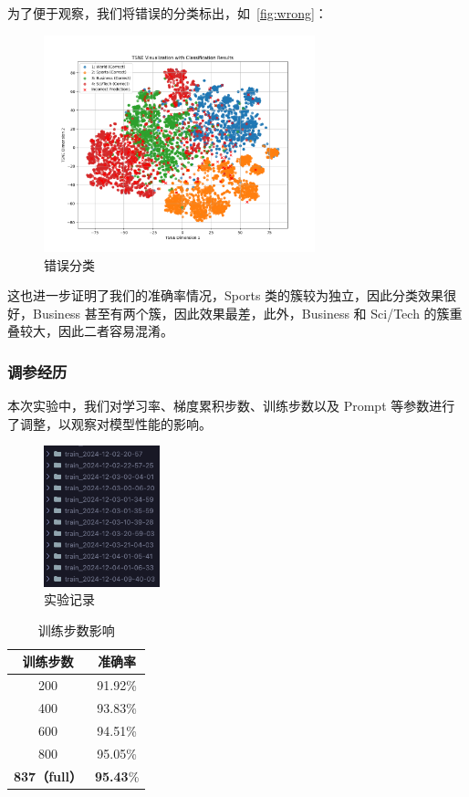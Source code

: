 为了便于观察，我们将错误的分类标出，如~\autoref{fig:wrong}：\begin{figure}[htbp]
    \centering
    \includegraphics[width=0.7\textwidth]{images/classification_tsne_with_incorrect.png}
    \caption{错误分类}
    \label{fig:wrong}
\end{figure}

这也进一步证明了我们的准确率情况，Sports 类的簇较为独立，因此分类效果很好，Business 甚至有两个簇，因此效果最差，此外，Business 和 Sci/Tech 的簇重叠较大，因此二者容易混淆。

\subsubsection{调参经历} \label{sec:exp}

本次实验中，我们对学习率、梯度累积步数、训练步数以及 Prompt 等参数进行了调整，以观察对模型性能的影响。

\begin{figure}[htbp]
    \centering
    \includegraphics[width=0.3\textwidth]{images/save.png}
    \caption{实验记录}
\end{figure}

\begin{table}[htbp]
    \centering
    \begin{tabular}{cc}
        \toprule
        训练步数 & 准确率 \\
        \midrule
        200 & 91.92\% \\
        400 & 93.83\% \\
        600 & 94.51\% \\
        800 & 95.05\% \\
        \textbf{837（full）} & \textbf{95.43}\% \\
        \bottomrule
    \end{tabular}
    \caption{训练步数影响}
\end{table}

